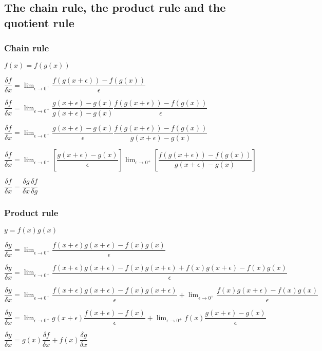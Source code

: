 
\subsection{The chain rule, the product rule and the quotient rule}

\subsubsection{Chain rule}

\(f(x)=f(g(x))\)

\(\dfrac{\delta f}{\delta x}=\lim_{\epsilon \rightarrow 0^+}\dfrac{f(g(x+\epsilon) )-f(g(x))}{\epsilon }\)

\(\dfrac{\delta f}{\delta x}=\lim_{\epsilon \rightarrow 0^+}\dfrac{g(x+\epsilon )-g(x)}{g(x+\epsilon )-g(x)}\dfrac{f(g(x+\epsilon) )-f(g(x))}{\epsilon }\)

\(\dfrac{\delta f}{\delta x}=\lim_{\epsilon \rightarrow 0^+}\dfrac{g(x+\epsilon )-g(x)}{\epsilon }\dfrac{f(g(x+\epsilon) )-f(g(x))}{g(x+\epsilon )-g(x)}\)

\(\dfrac{\delta f}{\delta x}=\lim_{\epsilon \rightarrow 0^+}[\dfrac{g(x+\epsilon )-g(x)}{\epsilon }]\lim_{\epsilon \rightarrow 0^+}[\dfrac{f(g(x+\epsilon) )-f(g(x))}{g(x+\epsilon )-g(x)}]\)

\(\dfrac{\delta f}{\delta x}=\dfrac{\delta g}{\delta x}\dfrac{\delta f}{\delta g}\)

\subsubsection{Product rule}

\(y=f(x)g(x)\)

\(\dfrac{\delta y}{\delta x}=\lim_{\epsilon \rightarrow 0^+}\dfrac{f(x+\epsilon )g(x+\epsilon )-f(x)g(x)}{\epsilon }\)

\(\dfrac{\delta y}{\delta x}=\lim_{\epsilon \rightarrow 0^+}\dfrac{f(x+\epsilon )g(x+\epsilon )-f(x)g(x+\epsilon )+f(x)g(x+\epsilon )-f(x)g(x)}{\epsilon }\)

\(\dfrac{\delta y}{\delta x}=\lim_{\epsilon \rightarrow 0^+}\dfrac{f(x+\epsilon )g(x+\epsilon )-f(x)g(x+\epsilon )}{\epsilon }+\lim_{\epsilon \rightarrow 0^+}\dfrac{f(x)g(x+\epsilon )-f(x)g(x)}{\epsilon }\)

\(\dfrac{\delta y}{\delta x}=\lim_{\epsilon \rightarrow 0^+}g(x+\epsilon )\dfrac{f(x+\epsilon )-f(x)}{\epsilon }+\lim_{\epsilon \rightarrow 0^+}f(x)\dfrac{g(x+\epsilon )-g(x)}{\epsilon }\)

\(\dfrac{\delta y}{\delta x}=g(x)\dfrac{\delta f}{\delta x }+f(x)\dfrac{\delta g}{\delta x}\)

